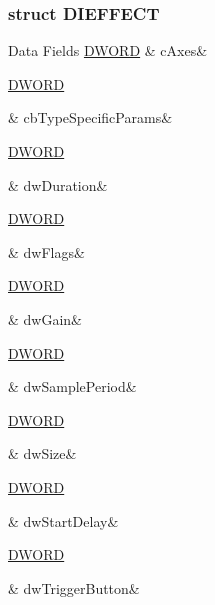 \subsubsection{struct D\-I\-E\-F\-F\-E\-C\-T}
\begin{DoxyFields}{Data Fields}
\hypertarget{a00003_a6ef1227420cb5a1a48ac004d53480756}{\hyperlink{a00003_a50e15ae51c87ae06ab29c8148cb5f36c}{D\-W\-O\-R\-D}}\label{a00003_a6ef1227420cb5a1a48ac004d53480756}
&
c\-Axes&
\\
\hline

\hypertarget{a00003_ac6a9b2f7eb98cf2babca1b1dff163459}{\hyperlink{a00003_a50e15ae51c87ae06ab29c8148cb5f36c}{D\-W\-O\-R\-D}}\label{a00003_ac6a9b2f7eb98cf2babca1b1dff163459}
&
cb\-Type\-Specific\-Params&
\\
\hline

\hypertarget{a00003_a7aeace215439e67e8676bb3d6455c37e}{\hyperlink{a00003_a50e15ae51c87ae06ab29c8148cb5f36c}{D\-W\-O\-R\-D}}\label{a00003_a7aeace215439e67e8676bb3d6455c37e}
&
dw\-Duration&
\\
\hline

\hypertarget{a00003_a4d2f405b1141000eb2af256e0fc8b98b}{\hyperlink{a00003_a50e15ae51c87ae06ab29c8148cb5f36c}{D\-W\-O\-R\-D}}\label{a00003_a4d2f405b1141000eb2af256e0fc8b98b}
&
dw\-Flags&
\\
\hline

\hypertarget{a00003_a9c764fcd1d75a20ee67a859f0b15631a}{\hyperlink{a00003_a50e15ae51c87ae06ab29c8148cb5f36c}{D\-W\-O\-R\-D}}\label{a00003_a9c764fcd1d75a20ee67a859f0b15631a}
&
dw\-Gain&
\\
\hline

\hypertarget{a00003_a37f869306a4c4735b1e637b7f9bd5e44}{\hyperlink{a00003_a50e15ae51c87ae06ab29c8148cb5f36c}{D\-W\-O\-R\-D}}\label{a00003_a37f869306a4c4735b1e637b7f9bd5e44}
&
dw\-Sample\-Period&
\\
\hline

\hypertarget{a00003_a669c5a85f5a9eb97e64ad880fadaaa2d}{\hyperlink{a00003_a50e15ae51c87ae06ab29c8148cb5f36c}{D\-W\-O\-R\-D}}\label{a00003_a669c5a85f5a9eb97e64ad880fadaaa2d}
&
dw\-Size&
\\
\hline

\hypertarget{a00003_a9ad5146be2e5f4b97a49c7c3aec7789d}{\hyperlink{a00003_a50e15ae51c87ae06ab29c8148cb5f36c}{D\-W\-O\-R\-D}}\label{a00003_a9ad5146be2e5f4b97a49c7c3aec7789d}
&
dw\-Start\-Delay&
\\
\hline

\hypertarget{a00003_a12e2027336e025cd2bd5cfe30cea5292}{\hyperlink{a00003_a50e15ae51c87ae06ab29c8148cb5f36c}{D\-W\-O\-R\-D}}\label{a00003_a12e2027336e025cd2bd5cfe30cea5292}
&
dw\-Trigger\-Button&
\\
\hline


\end{DoxyFields}
